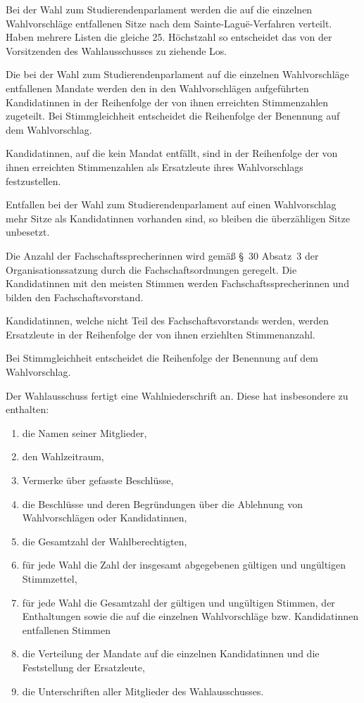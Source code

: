 \begin{jurdoc}
\label{wahl:sitzverteilungstupa}
Bei der Wahl zum Studierendenparlament werden die auf die einzelnen Wahlvorschläge entfallenen Sitze nach dem Sainte-Laguë-Verfahren verteilt. Haben mehrere Listen die gleiche 25. Höchstzahl so entscheidet das von der Vorsitzenden des Wahlausschusses zu ziehende Los.

Die bei der Wahl zum Studierendenparlament auf die einzelnen Wahlvorschläge entfallenen Mandate werden den in den Wahlvorschlägen aufgeführten Kandidatinnen in der Reihenfolge der von ihnen erreichten Stimmenzahlen zugeteilt. Bei Stimmgleichheit entscheidet die Reihenfolge der Benennung auf dem Wahlvorschlag.

Kandidatinnen, auf die kein Mandat entfällt, sind in der Reihenfolge der von ihnen erreichten Stimmenzahlen als Ersatzleute ihres Wahlvorschlags festzustellen. 

Entfallen bei der Wahl zum Studierendenparlament auf einen Wahlvorschlag mehr Sitze als Kandidatinnen vorhanden sind, so bleiben die überzähligen Sitze unbesetzt.

\label{wahl:fsvorstaende}
Die Anzahl der Fachschaftssprecherinnen wird gemäß §~30 Absatz~3 der Organisationssatzung durch die Fachschaftsordnungen geregelt. Die Kandidatinnen mit den meisten Stimmen werden Fachschaftssprecherinnen und bilden den Fachschaftsvorstand.

Kandidatinnen, welche nicht Teil des Fachschaftsvorstands werden, werden Ersatzleute in der Reihenfolge der von ihnen erziehlten Stimmenanzahl. 

Bei Stimmgleichheit entscheidet die Reihenfolge der Benennung auf dem Wahlvorschlag.

\label{wahl:wahlniederschrift}
Der Wahlausschuss fertigt eine Wahlniederschrift an. Diese hat insbesondere zu enthalten: 
\begin{enumerate}
    \item die Namen seiner Mitglieder,
    \item den Wahlzeitraum,
    \item Vermerke über gefasste Beschlüsse,
    \item die Beschlüsse und deren Begründungen über die Ablehnung von Wahlvorschlägen oder Kandidatinnen,
    \item die Gesamtzahl der Wahlberechtigten,
    \item für jede Wahl die Zahl der insgesamt abgegebenen gültigen und ungültigen Stimmzettel,
    \item für jede Wahl die Gesamtzahl der gültigen und ungültigen Stimmen, der Enthaltungen sowie die auf die einzelnen Wahlvorschläge bzw. Kandidatinnen entfallenen Stimmen
    \item die Verteilung der Mandate auf die einzelnen Kandidatinnen und die Feststellung der Ersatzleute,
    \item die Unterschriften aller Mitglieder des Wahlausschusses.
\end{enumerate}


\end{jurdoc}
